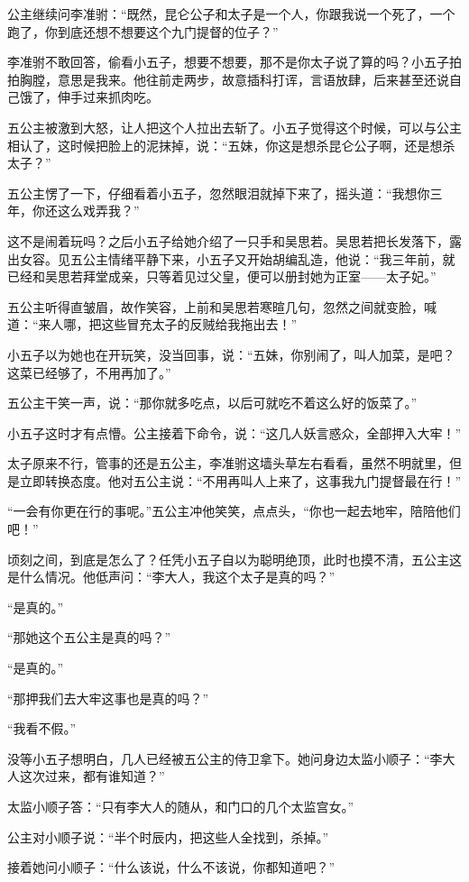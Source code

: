 公主继续问李准驸：“既然，昆仑公子和太子是一个人，你跟我说一个死了，一个跑了，你到底还想不想要这个九门提督的位子？”

李准驸不敢回答，偷看小五子，想要不想要，那不是你太子说了算的吗？小五子拍拍胸膛，意思是我来。他往前走两步，故意插科打诨，言语放肆，后来甚至还说自己饿了，伸手过来抓肉吃。

五公主被激到大怒，让人把这个人拉出去斩了。小五子觉得这个时候，可以与公主相认了，这时候把脸上的泥抹掉，说：“五妹，你这是想杀昆仑公子啊，还是想杀
太子？”

五公主愣了一下，仔细看着小五子，忽然眼泪就掉下来了，摇头道：“我想你三年，你还这么戏弄我？”

这不是闹着玩吗？之后小五子给她介绍了一只手和吴思若。吴思若把长发落下，露出女容。见五公主情绪平静下来，小五子又开始胡编乱造，他说：“我三年前，就已经和吴思若拜堂成亲，只等着见过父皇，便可以册封她为正室——太子妃。”

五公主听得直皱眉，故作笑容，上前和吴思若寒暄几句，忽然之间就变脸，喊道：“来人哪，把这些冒充太子的反贼给我拖出去！”

小五子以为她也在开玩笑，没当回事，说：“五妹，你别闹了，叫人加菜，是吧？这菜已经够了，不用再加了。”

五公主干笑一声，说：“那你就多吃点，以后可就吃不着这么好的饭菜了。”

小五子这时才有点懵。公主接着下命令，说：“这几人妖言惑众，全部押入大牢！”

太子原来不行，管事的还是五公主，李准驸这墙头草左右看看，虽然不明就里，但是立即转换态度。他对五公主说：“不用再叫人上来了，这事我九门提督最在行！”

“一会有你更在行的事呢。”五公主冲他笑笑，点点头，“你也一起去地牢，陪陪他们吧！”

顷刻之间，到底是怎么了？任凭小五子自以为聪明绝顶，此时也摸不清，五公主这是什么情况。他低声问：“李大人，我这个太子是真的吗？”

“是真的。”

“那她这个五公主是真的吗？”

“是真的。”

“那押我们去大牢这事也是真的吗？”

“我看不假。”

没等小五子想明白，几人已经被五公主的侍卫拿下。她问身边太监小顺子：“李大人这次过来，都有谁知道？”

太监小顺子答：“只有李大人的随从，和门口的几个太监宫女。”

公主对小顺子说：“半个时辰内，把这些人全找到，杀掉。”

接着她问小顺子：“什么该说，什么不该说，你都知道吧？”

